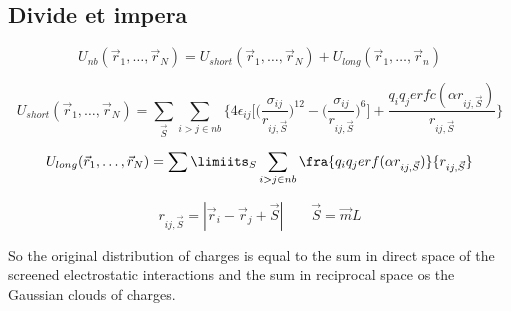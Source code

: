 	\subsection{Divide et impera}

	$$U_{nb}(\vec{r}_1, \dots, \vec{r}_N) = U_{short}(\vec{r}_1, \dots, \vec{r}_N) + U_{long}(\vec{r}_1, \dots, \vec{r}_n)$$

	$$U_{short}(\vec{r}_1, \dots, \vec{r}_N) = \sum\limits_{\vec{S}}\sum\limits_{i>j\in nb}\biggl\{4\epsilon_{ij}\biggl[\biggl(\frac{\sigma_{ij}}{r_{ij,\vec{S}}}\biggr)^{12}-\biggl(\frac{\sigma_{ij}}{r_{ij, \vec{S}}}\biggr)^6\biggr] + \frac{q_iq_jerfc(\alpha r_{ij, \vec{S}})}{r_{ij, \vec{S}}}\biggr\}$$

	$$U_{long}(\vec{r}_1, \dots, \vec{r}_N) = \sum\limiits_S\sum\limits_{i>j\in nb} \fra{q_iq_j erf(\alpha r_{ij, \vec{S}})}{r_{ij, \vec{S}}}$$

	$$r_{ij, \vec{S}} = |\vec{r}_i-\vec{r}_j + \vec{S}|\qquad \vec{S} = \vec{m}L$$

	So the original distribution of charges is equal to the sum in direct space of the screened electrostatic interactions and the sum in reciprocal space os the Gaussian clouds of charges.
